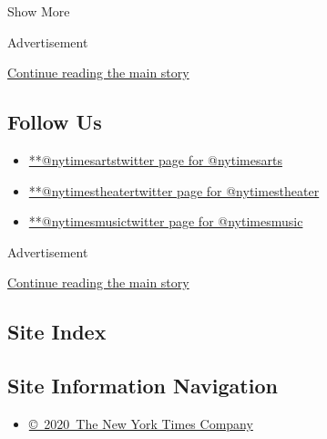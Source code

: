 Show More

Advertisement

\protect\hyperlink{after-mid2}{Continue reading the main story}

\hypertarget{follow-us}{%
\subsection{Follow Us}\label{follow-us}}

\begin{itemize}
\tightlist
\item
  \href{https://twitter.com/nytimesarts}{**@nytimesartstwitter page for
  @nytimesarts}
\item
  \href{https://twitter.com/nytimestheater}{**@nytimestheatertwitter
  page for @nytimestheater}
\item
  \href{https://twitter.com/nytimesmusic}{**@nytimesmusictwitter page
  for @nytimesmusic}
\end{itemize}

Advertisement

\protect\hyperlink{after-mktg}{Continue reading the main story}

\hypertarget{site-index}{%
\subsection{Site Index}\label{site-index}}

\hypertarget{site-information-navigation}{%
\subsection{Site Information
Navigation}\label{site-information-navigation}}

\begin{itemize}
\tightlist
\item
  \href{https://help.nytimes3xbfgragh.onion/hc/en-us/articles/115014792127-Copyright-notice}{©~2020~The
  New York Times Company}
\end{itemize}

